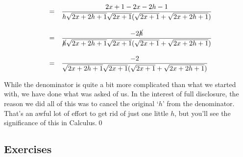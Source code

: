 \begin{ex}
\[\begin{array}{rcl}
& = & \dfrac{2x+1 -2x-2h-1}{h\sqrt{2x+2h+1} \sqrt{2x+1}(\sqrt{2x+1} + \sqrt{2x+2h+1})} \\[20pt]

& = & \dfrac{-2\cancel{h}}{\cancel{h}\sqrt{2x+2h+1} \sqrt{2x+1}(\sqrt{2x+1} + \sqrt{2x+2h+1})} \\[20pt]
& = & \dfrac{-2}{\sqrt{2x+2h+1} \sqrt{2x+1}(\sqrt{2x+1} + \sqrt{2x+2h+1})} \\
\end{array}\] 

While the denominator is quite a bit more complicated than what we started with, we have done what was asked of us.  In the interest of full disclosure, the reason we did all of this was to cancel the original `$h$' from the denominator. That's an awful lot of effort to get rid of just one little $h$, but you'll see the significance of this in Calculus.\qed

\end{ex}

\newpage

\subsection{Exercises}



\closegraphsfile